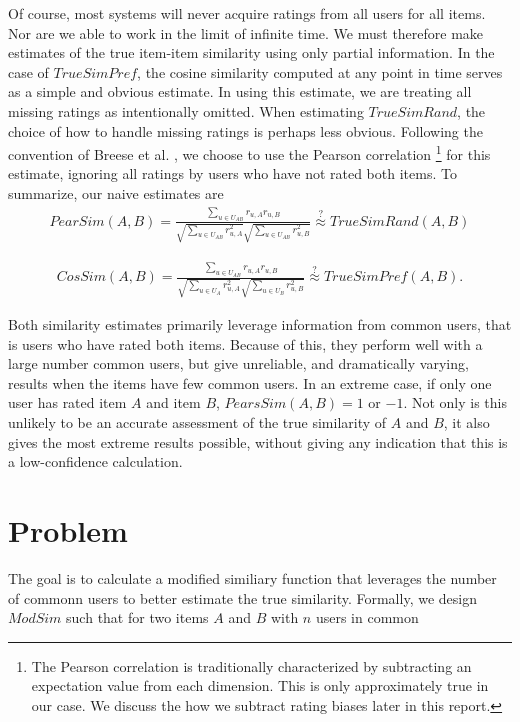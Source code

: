 \documentclass[11pt]{article}
\begin{document}
Of course, most systems will never acquire ratings from all users for all items.
Nor are we able to work in the limit of infinite time. We must therefore make
estimates of the true item-item similarity using only partial information. In
the case of $TrueSimPref$, the cosine similarity computed at any point in time
serves as a simple and obvious estimate. In using this estimate, we are treating
all missing ratings as intentionally omitted. When estimating $TrueSimRand$, the
choice of how to handle missing ratings is perhaps less obvious. Following the
convention of Breese et al. \cite{Breese1998}, we choose to use the Pearson
correlation \footnote{The Pearson correlation is traditionally characterized by
subtracting an expectation value from each dimension. This is only approximately
true in our case. We discuss the how we subtract rating biases later in this
report.} for this estimate, ignoring all ratings by users who have not rated
both items. To summarize, our naive estimates are
\begin{align}
PearSim(A, B) = \frac{\sum\limits_{u\in U_{AB}}
r_{u,A}r_{u,B}}{\sqrt{\sum\limits_{u\in U_{AB}} r_{u,A}^2}
\sqrt{\sum\limits_{u\in U_{AB}} r_{u,B}^2}}
\stackrel{?}{\approx} TrueSimRand(A, B)
\end{align}

\begin{align}
CosSim(A, B) = \frac{\sum\limits_{u\in U_{AB}}
r_{u,A}r_{u,B}}{\sqrt{\sum\limits_{u\in U_A} r_{u,A}^2}
\sqrt{\sum\limits_{u\in U_B} r_{u,B}^2}}
\stackrel{?}{\approx} TrueSimPref(A, B).
\end{align}

Both similarity estimates primarily leverage information from common users, that
is users who have rated both items. Because of this, they perform well with a
large number common users, but give unreliable, and dramatically varying,
results when the items have few common users. In an extreme case, if only one
user has rated item $A$ and item $B$, $PearsSim(A, B) = 1$ or $-1$. Not only is
this unlikely to be an accurate assessment of the true similarity of $A$ and
$B$, it also gives the most extreme results possible, without giving any
indication that this is a low-confidence calculation.

\section*{Problem}

The goal is to calculate a modified similiary function that leverages the number
of commonn users to better estimate the true similarity. Formally, we design
$ModSim$ such that for two items $A$ and $B$ with $n$ users in common
\end{document}
